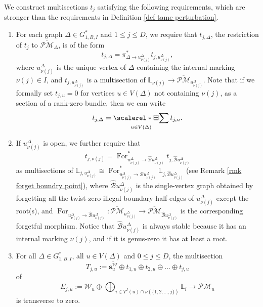 \documentclass[11pt]{amsart}
\theoremstyle{definition}
\theoremstyle{remark}
\newcommand{\oPMb}{{\overline{\mathcal{PM}}}}
\newcommand{\<}{\left<}
\renewcommand{\>}{\right>}
\numberwithin{equation}{section}
\DeclareMathOperator*{\bboxplus}{\scalerel*{\boxplus}{\sum}}
\begin{document}
We construct multisections $t_j$ satisfying the following requirements, which are stronger than the requirements in Definition \ref{def tame perturbation}. 
\begin{enumerate}
    \item For each graph $\Delta \in G_{1,B,I}^*$ and $1\le j \le D$, we require that $t_{j,\Delta}$, the restriction of $t_j$ to $\oPMb_\Delta$, is of the form
    \begin{equation}\label{eq recursive of section of Li}
        t_{j,\Delta}=\pi^*_{\Delta \to u^{\Delta}_{\nu(j)}} t_{j,u^{\Delta}_{\nu(j)}},
    \end{equation}
    where $u^{\Delta}_{\nu(j)}$ is the unique vertex of $\Delta$ containing the internal marking $\nu(j)\in I$, 
    and $t_{j,u^{\Delta}_{\nu(j)}}$ is a multisection of $\mathbb L_{\nu(j)}\to \oPMb_{u^{\Delta}_{\nu(j)}}$. Note that if we formally set $t_{j,u}=0$ for vertices $u\in V(\Delta)$ not containing $\nu(j)$, as a section of a rank-zero bundle, then we can write 
     \begin{equation}
        t_{j,\Delta}=\bboxplus_{u\in V(\Delta)}t_{j,u}.
    \end{equation}
    
  
    \item 
    If $u^{\Delta}_{\nu(j)}$ is open, we further require that 
    \begin{equation}\label{eq section of Li pull back from modified base}
        t_{j,\nu(j)}=\operatorname{For}^*_{u^{\Delta}_{\nu(j)} \to \hat{\mathcal B}u^{\Delta}_{\nu(j)}} t_{j,\hat{\mathcal B}u^{\Delta}_{\nu(j)}}
    \end{equation}
     as multisections of $\mathbb L_{j,u^{\Delta}_{\nu(j)}} \cong \operatorname{For}^*_{u^{\Delta}_{\nu(j)} \to \hat{\mathcal B}u^{\Delta}_{\nu(j)}} \mathbb L_{j,\hat{\mathcal B}u^{\Delta}_{\nu(j)}}$ (see Remark \ref{rmk forget boundry point}),
    where $\hat{\mathcal B}u^{\Delta}_{\nu(j)}$ is the single-vertex graph obtained by forgetting all the twist-zero illegal boundary half-edges of $u^{\Delta}_{\nu(j)}$ except the root(s), and $\operatorname{For}_{u^{\Delta}_{\nu(j)} \to \hat{\mathcal B}u^{\Delta}_{\nu(j)}}\colon \oPMb_{u^{\Delta}_{\nu(j)}} \to \oPMb_{\hat{\mathcal B}u^{\Delta}_{\nu(j)}}$ is the corresponding forgetful morphism. 
    Notice that $\hat{\mathcal B}u^{\Delta}_{\nu(j)}$ is always stable because it has an internal marking $\nu(j)$, and if it is genus-zero it has at least a root.

   

    \item \label{item transverse of L together with W in construction}
    For all $\Delta \in G_{1,B,I}^*$, all $u\in V(\Delta)$ and $0\le j \le D$, the multisection 
        $${T_{j,u}}:=\overline{\bm{s}^{\mathcal W}_u} \oplus t_{1,u}\oplus t_{2,u}\oplus\dots \oplus t_{j,u}$$ 
        of 
        $$E_{j,u}:=\mathcal W_{u}\oplus \bigoplus_{i\in T^I(u)\cap \nu(\{1,2,\dots,j\})} \mathbb L_i\to \oPMb_u$$ is transverse to zero.
    

\end{enumerate}
\end{document}
